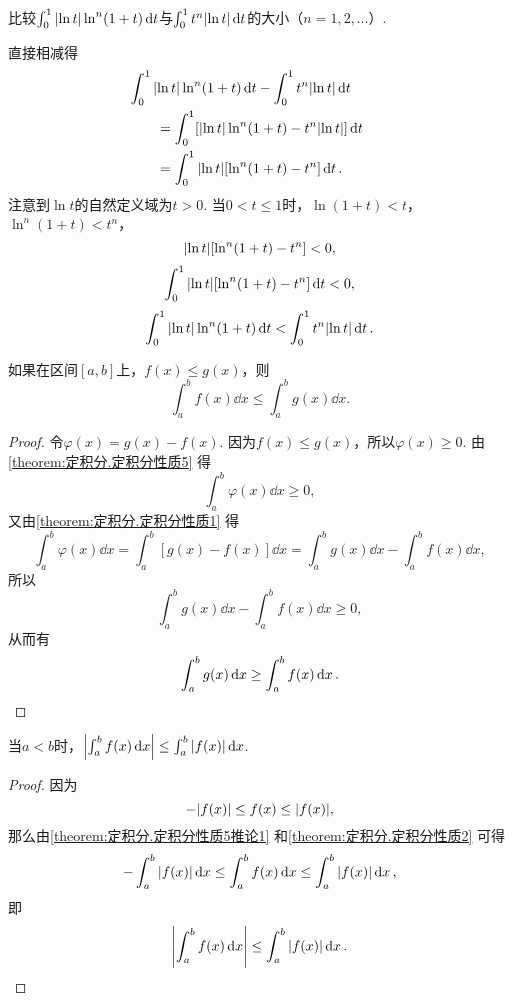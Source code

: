 \begin{example}
比较\(\int_0^1 \abs{\ln t} \ln^n(1+t) \dd{t}\)与\(\int_0^1 t^n \abs{\ln t} \dd{t}\)的大小（\(n=1,2,\dotsc\)）.
\begin{solution}
直接相减得
\begin{align*}
&\hspace{-20pt}
\int_0^1 \abs{\ln t} \ln^n(1+t) \dd{t} - \int_0^1 t^n \abs{\ln t} \dd{t} \\
&= \int_0^1 [\abs{\ln t} \ln^n(1+t) - t^n \abs{\ln t}] \dd{t} \\
&= \int_0^1 \abs{\ln t} [\ln^n(1+t) - t^n] \dd{t}.
\end{align*}
注意到\(\ln t\)的自然定义域为\(t > 0\).
当\(0 < t \leq 1\)时，\(\ln(1+t) < t\)，\(\ln^n(1+t) < t^n\)，\[
\abs{\ln t} [\ln^n(1+t) - t^n] < 0,
\]\[
\int_0^1 \abs{\ln t} [\ln^n(1+t) - t^n] \dd{t} < 0,
\]\[
\int_0^1 \abs{\ln t} \ln^n(1+t) \dd{t} < \int_0^1 t^n \abs{\ln t} \dd{t}.
\]
\end{solution}
\end{example}

\begin{corollary}\label{theorem:定积分.定积分性质5推论1}
如果在区间\([a,b]\)上，\(f(x) \leq g(x)\)，则\[
\int_a^b f(x) \dd{x} \leq \int_a^b g(x) \dd{x}.
\]
\begin{proof}
令\(\varphi(x) = g(x) - f(x)\).
因为\(f(x) \leq g(x)\)，所以\(\varphi(x) \geq 0\).
由\cref{theorem:定积分.定积分性质5} 得\[
\int_a^b \varphi(x) \dd{x} \geq 0,
\]又由\cref{theorem:定积分.定积分性质1} 得\[
\int_a^b \varphi(x) \dd{x}
= \int_a^b [g(x) - f(x)] \dd{x}
= \int_a^b g(x) \dd{x} - \int_a^b f(x) \dd{x},
\]所以\[
\int_a^b g(x) \dd{x} - \int_a^b f(x) \dd{x} \geq 0,
\]从而有\[
\int_a^b g(x) \dd{x} \geq \int_a^b f(x) \dd{x}.
\qedhere
\]
\end{proof}
\end{corollary}

\begin{corollary}\label{theorem:定积分.定积分性质5推论2}
当\(a<b\)时，\(\abs{\int_a^b f(x) \dd{x}} \leq \int_a^b \abs{f(x)} \dd{x}\).
\begin{proof}
因为\[
-\abs{f(x)} \leq f(x) \leq \abs{f(x)},
\]那么由\cref{theorem:定积分.定积分性质5推论1} 和\cref{theorem:定积分.定积分性质2} 可得\[
-\int_a^b \abs{f(x)} \dd{x}
\leq
\int_a^b f(x) \dd{x}
\leq
\int_a^b \abs{f(x)} \dd{x},
\]即\[
\abs{\int_a^b f(x) \dd{x}} \leq \int_a^b \abs{f(x)} \dd{x}.
\qedhere
\]
\end{proof}
\end{corollary}

